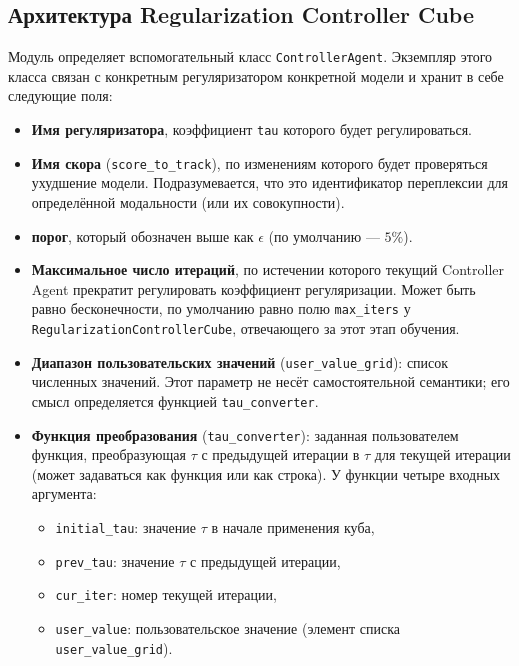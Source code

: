 \subsection{Архитектура Regularization Controller Cube}

Модуль определяет вспомогательный класс
\texttt{ControllerAgent}. Экземпляр этого класса связан с конкретным регуляризатором конкретной модели и хранит в себе следующие поля:

\begin{itemize}
    \item \textbf{Имя регуляризатора}, коэффициент \texttt{tau} которого будет регулироваться.
    \item \textbf{Имя скора} (\texttt{score\_to\_track}), по изменениям которого будет проверяться ухудшение модели. Подразумевается, что это идентификатор переплексии для определённой модальности (или их совокупности). 
    \item \textbf{порог}, который обозначен выше как $\epsilon$ (по умолчанию --- $5\%$).
    \item \textbf{Максимальное число итераций}, по истечении которого текущий Controller Agent  прекратит регулировать коэффициент регуляризации. Может быть равно бесконечности, по умолчанию равно полю \texttt{max\_iters} у  \texttt{RegularizationControllerCube}, отвечающего за этот этап обучения.
    \item \textbf{Диапазон пользовательских значений} (\texttt{user\_value\_grid}): список численных значений. Этот параметр не несёт самостоятельной семантики; его смысл определяется функцией \texttt{tau\_converter}.
    \item \textbf{Функция преобразования} (\texttt{tau\_converter}): заданная пользователем функция, преобразующая $\tau$ с предыдущей итерации в $\tau$ для текущей итерации (может задаваться как функция или как строка). У функции четыре входных аргумента: 
    \begin{itemize}
        \item \texttt{initial\_tau}: значение $\tau$ в начале применения куба,
        \item \texttt{prev\_tau}: значение $\tau$ с предыдущей итерации,
        \item  \texttt{cur\_iter}: номер текущей итерации,
        \item \texttt{user\_value}: пользовательское значение (элемент списка \texttt{user\_value\_grid}).
    \end{itemize}
\end{itemize}

